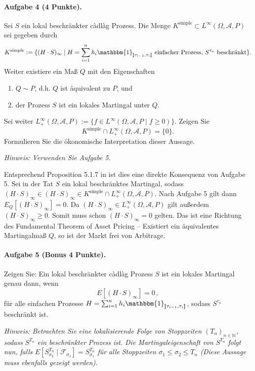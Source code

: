 \documentclass{article}
\begin{document}
\paragraph{Aufgabe 4 \textnormal{(4 Punkte)}.}
Sei $S$ ein lokal beschränkter càdlàg Prozess.
Die Menge $K^\text{simple}\subset L^\infty(\Omega,\mathscr{A},P)$ sei gegeben durch
\[
  K^\text{simple}:=\{(H\cdot S)_\infty\mid H=\sum_{i=1}^n h_i\mathbbm{1}_{\rrbracket\tau_{i-1},\tau_i\rrbracket}\text{ einfacher Prozess, $S^{\tau_n}$ beschränkt}\}.
\]
Weiter existiere ein Maß $Q$ mit den Eigenschaften
\begin{enumerate}
\item $Q\sim P$, d.h. $Q$ ist äquivalent zu $P$, und
\item der Prozess $S$ ist ein lokales Martingal unter $Q$.
\end{enumerate}
Sei weiter $L_+^\infty(\Omega,\mathscr{A},P):=\{f\in L^\infty(\Omega,\mathscr{A},P\mid f\geq0)\}$.
Zeigen Sie
\[
K^\text{simple}\cap L^\infty_+(\Omega,\mathscr{A},P)=\{0\}.
\]
Formulieren Sie die ökonomische Interpretation dieser Aussage.

\noindent\emph{Hinweis: Verwenden Sie Aufgabe 5.}

Entsprechend Proposition 5.1.7 in \cite{Delbaen2006} ist dies eine direkte Konsequenz von Aufgabe 5.
Sei in der Tat $S$ ein lokal beschränktes Martingal, sodass $(H\cdot S)_\infty\in (H\cdot S)_\infty\in K^\text{simple}\cap L_+^\infty(\Omega,\mathscr{A},P)$.
Nach Aufgabe 5 gilt dann $E_Q[(H\cdot S)_\infty]=0$.
Da $(H\cdot S)_\infty\in L_+^\infty(\Omega,\mathscr{A},P)$ gilt außerdem $(H\cdot S)_\infty\geq0$.
Somit muss schon $(H\cdot S)_\infty=0$ gelten.
Das ist eine Richtung des Fundamental Theorem of Asset Pricing -- Existiert ein äquivalentes Martingalmaß $Q$, so ist der Markt frei von Arbitrage.
\pagebreak
\paragraph{Aufgabe 5 \textnormal{(Bonus 4 Punkte)}.}
Zeigen Sie: Ein lokal beschränkter càdlàg Prozess $S$ ist ein lokales Martingal genau dann, wenn
\[
  E[(H\cdot S)_\infty]=0\,,
\]
für alle einfachen Prozesse $H=\sum_{i=1}^nh_i\mathbbm{1}_{\rrbracket \tau_{i-1},\tau_i\rrbracket}$, sodass $S^{\tau_n}$ beschränkt ist.

\noindent\emph{Hinweis: Betrachten Sie eine lokalisierende Folge von Stoppzeiten $(T_n)_{n\in\mathbb{N}}$, sodass $S^{T_n}$ ein beschränkter Prozess ist.
Die Martingaleigenschaft von $S^{T_n}$ folgt nun, falls $E[S_{\sigma_2}^{T_n}\mid \mathscr{F}_{\sigma_1}]=S_{\sigma_1}^{T_n}$ für alle Stoppzeiten $\sigma_1\leq\sigma_2\leq T_n$ (Diese Aussage muss ebenfalls gezeigt werden).}
\end{document}
